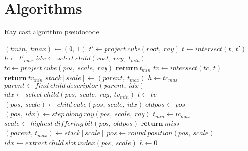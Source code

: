 \section{Algorithms}
\label{app:algorithms}
\begin{algorithm}
\caption{Ray cast algorithm pseudocode \parencite{laine10efficientsvos}}
\label{alg:raycast}
\begin{algorithmic}[1]
	\State $(tmin,~tmax) \gets (0,~1)$ 
	\State $t' \gets project~cube(root,~ray)$
	\State $t \gets intersect(t,~t')$
	\State $h \gets t'_{max}$
	\State $idx \gets select~child(root,~ray,~t_{min})$
	 
		\State $tc \gets project~cube(pos,~scale,~ray)$
			 
				\State $\textbf{return}~t_{min}$
			\EndIf
			\State $tv \gets intersect(tc, ~t)$
			 
					\State $\textbf{return}~tv_{min}$
				\EndIf
					\State $stack[scale] \gets (parent,~t_{max})$
				\EndIf
				\State $h \gets tc_{max}$
				\State $parent \gets find~child~descriptor(parent,~idx)$
				\State $idx \gets select~child(pos,~scale,~ray,~tv_{min})$
				\State $t \gets tv$
				\State $(pos,~scale) \gets child~cube(pos,~scale,~idx)$
			\EndIf
		\EndIf
		\State $oldpos \gets pos$ 
		\State $(pos,~idx) \gets step~along~ray(pos,~scale,~ray)$
		\State $t_{min} \gets tc_{max}$
		 
			\State $scale \gets highest~differing~bit(pos,~oldpos)$
				\State $\textbf{return}~miss$
			\EndIf
			\State $(parent,~t_{max}) \gets stack[scale]$
			\State $pos \gets round~position(pos,~scale)$
			\State $idx \gets extract~child~slot~index(pos,~scale)$
			\State $h \gets 0$
		\EndIf
	\EndWhile
\EndProcedure
\end{algorithmic}
\end{algorithm}

